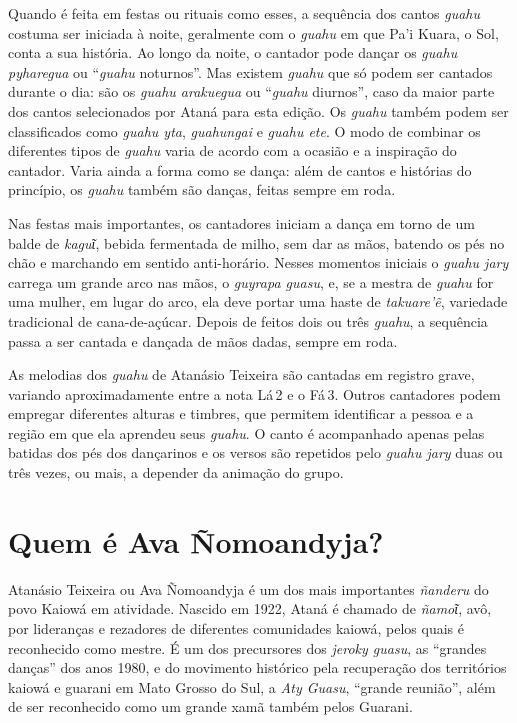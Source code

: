 Quando é feita em festas ou rituais como esses, a sequência dos cantos
\textit{guahu} costuma ser iniciada à noite, geralmente com o \textit{guahu}
em que Pa'i Kuara, o Sol, conta a sua história. Ao longo da noite, o
cantador pode dançar os \textit{guahu pyharegua} ou ``\textit{guahu} noturnos''.
Mas existem \textit{guahu} que só podem ser cantados durante o dia: são os
\textit{guahu arakuegua} ou ``\textit{guahu} diurnos'', caso da maior parte dos
cantos selecionados por Ataná para esta edição. Os \textit{guahu} também
podem ser classificados como \textit{guahu yta}, \textit{guahungai} e
\textit{guahu ete}. O modo de combinar os diferentes tipos de \textit{guahu}
varia de acordo com a ocasião e a inspiração do cantador. Varia ainda a
forma como se dança: além de cantos e histórias do princípio, os
\textit{guahu} também são danças, feitas sempre em roda.

Nas festas mais importantes, os cantadores iniciam a dança em torno de
um balde de \textit{kaguῖ}, bebida fermentada de milho, sem dar as mãos,
batendo os pés no chão e marchando em sentido anti-horário. Nesses
momentos iniciais o \textit{guahu jary} carrega um grande arco nas mãos, o 
\textit{guyrapa guasu}, e, se a mestra de \textit{guahu} for uma
mulher, em lugar do arco, ela deve portar uma haste de \textit{takuare'ẽ},
variedade tradicional de cana-de-açúcar. Depois de feitos dois ou três
\textit{guahu}, a sequência passa a ser cantada e dançada de mãos dadas,
sempre em roda.

As melodias dos \textit{guahu} de Atanásio Teixeira são cantadas em
registro grave, variando aproximadamente entre a nota Lá\,\textsc{2} e o Fá\,\textsc{3}.
Outros cantadores podem empregar diferentes alturas e timbres, que
permitem identificar a pessoa e a região em que ela aprendeu seus
\textit{guahu}. O canto é acompanhado apenas pelas batidas dos pés dos
dançarinos e os versos são repetidos pelo \textit{guahu jary} duas ou três
vezes, ou mais, a depender da animação do grupo.

\section{Quem é Ava Ñomoandyja?}

Atanásio Teixeira ou Ava Ñomoandyja é um dos mais importantes
\textit{ñanderu} do povo Kaiowá em atividade. Nascido em 1922, Ataná é
chamado de \textit{ñamoῖ}, avô, por lideranças e rezadores de diferentes
comunidades kaiowá, pelos quais é reconhecido como mestre. É um dos
precursores dos \textit{jeroky guasu}, as ``grandes danças'' dos anos 1980, e do
movimento histórico pela recuperação dos territórios kaiowá e guarani em
Mato Grosso do Sul, a \textit{Aty Guasu}, ``grande reunião'', além de ser 
reconhecido como um grande xamã também pelos Guarani.

